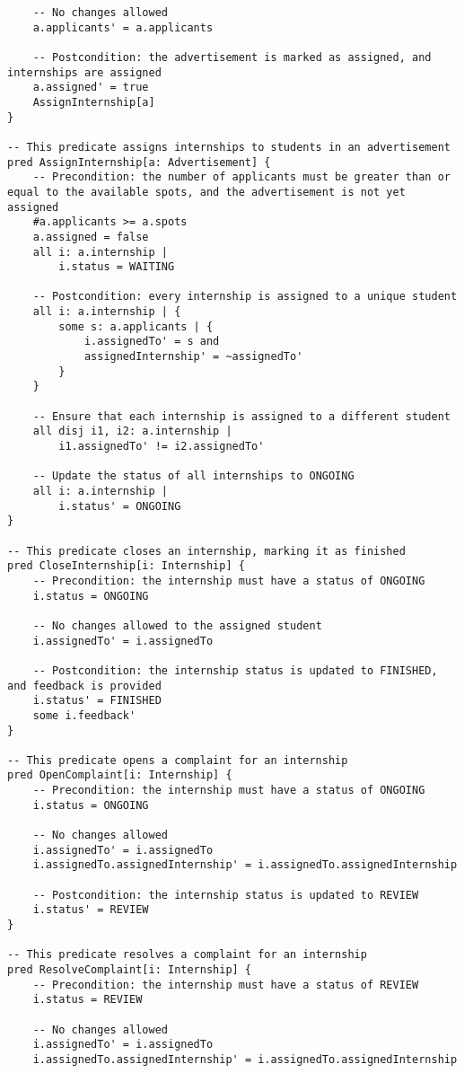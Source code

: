\begin{lstlisting}
    -- No changes allowed 
    a.applicants' = a.applicants

    -- Postcondition: the advertisement is marked as assigned, and internships are assigned
    a.assigned' = true
    AssignInternship[a]
}

-- This predicate assigns internships to students in an advertisement
pred AssignInternship[a: Advertisement] {
    -- Precondition: the number of applicants must be greater than or equal to the available spots, and the advertisement is not yet assigned
    #a.applicants >= a.spots
    a.assigned = false
    all i: a.internship |
        i.status = WAITING

    -- Postcondition: every internship is assigned to a unique student
    all i: a.internship | {
        some s: a.applicants | {
            i.assignedTo' = s and
            assignedInternship' = ~assignedTo'
        }
    }

    -- Ensure that each internship is assigned to a different student
    all disj i1, i2: a.internship |
        i1.assignedTo' != i2.assignedTo'

    -- Update the status of all internships to ONGOING
    all i: a.internship |
        i.status' = ONGOING
}

-- This predicate closes an internship, marking it as finished
pred CloseInternship[i: Internship] {
    -- Precondition: the internship must have a status of ONGOING
    i.status = ONGOING

    -- No changes allowed to the assigned student
    i.assignedTo' = i.assignedTo

    -- Postcondition: the internship status is updated to FINISHED, and feedback is provided
    i.status' = FINISHED
    some i.feedback'
}

-- This predicate opens a complaint for an internship 
pred OpenComplaint[i: Internship] {
    -- Precondition: the internship must have a status of ONGOING
    i.status = ONGOING

    -- No changes allowed 
    i.assignedTo' = i.assignedTo
    i.assignedTo.assignedInternship' = i.assignedTo.assignedInternship

    -- Postcondition: the internship status is updated to REVIEW
    i.status' = REVIEW
}

-- This predicate resolves a complaint for an internship
pred ResolveComplaint[i: Internship] {
    -- Precondition: the internship must have a status of REVIEW
    i.status = REVIEW

    -- No changes allowed 
    i.assignedTo' = i.assignedTo
    i.assignedTo.assignedInternship' = i.assignedTo.assignedInternship


\end{lstlisting}
